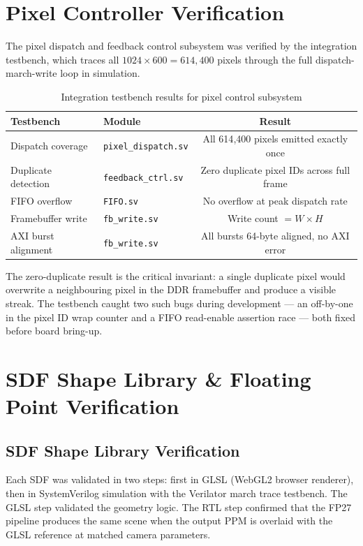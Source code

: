 \section{Pixel Controller Verification}

The pixel dispatch and feedback control subsystem was verified by the integration testbench, which traces all $1024\times600 =
614{,}400$ pixels through the full dispatch-march-write loop in simulation.

\begin{table}[h!]
\centering
\small
\caption{Integration testbench results for pixel control subsystem}
\label{tab:pixel-verify}
{\renewcommand{\arraystretch}{1.4}
\begin{tabular}{l l c}
\toprule
\textbf{Testbench} & \textbf{Module} & \textbf{Result} \\
\midrule
Dispatch coverage     & \texttt{pixel\_dispatch.sv}  & All 614{,}400 pixels emitted exactly once \\
Duplicate detection   & \texttt{feedback\_ctrl.sv}   & Zero duplicate pixel IDs across full frame \\
FIFO overflow         & \texttt{FIFO.sv}             & No overflow at peak dispatch rate \\
Framebuffer write     & \texttt{fb\_write.sv}        & Write count $= W \times H$ \\
AXI burst alignment   & \texttt{fb\_write.sv}        & All bursts 64-byte aligned, no AXI error \\
\bottomrule
\end{tabular}}
\end{table}

The zero-duplicate result is the critical invariant: a single duplicate pixel
would overwrite a neighbouring pixel in the DDR framebuffer and produce a
visible streak. The testbench caught two such bugs during development ---
an off-by-one in the pixel ID wrap counter and a FIFO read-enable assertion
race --- both fixed before board bring-up.

\section{SDF Shape Library \& Floating Point Verification}

\subsection{SDF Shape Library Verification}

Each SDF was validated in two steps: first in GLSL (WebGL2 browser renderer),
then in SystemVerilog simulation with the Verilator march trace testbench.
The GLSL step validated the geometry logic. The RTL step confirmed that the
FP27 pipeline produces the same scene when the output PPM is overlaid with
the GLSL reference at matched camera parameters.

